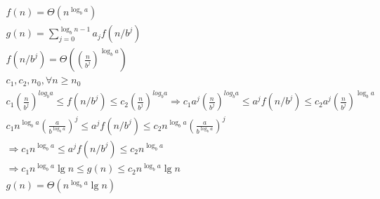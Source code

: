 $$
\begin{array}{l}
f(n)=\Theta\left(n^{\log _{b} a}\right) \\
g(n)=\sum_{j=0}^{\log _{b} n-1} a_{j} f\left(n / b^{j}\right) \\
f\left(n / b^{j}\right)=\Theta\left(\left(\frac{n}{b^{j}}\right)^{\log _{b} a}\right) \\
c_{1}, c_{2}, n_{0}, \forall n \geq n_{0} \\
c_{1}\left(\frac{n}{b^{j}}\right)^{l o g_{b} a} \leq f\left(n / b^{j}\right) \leq c_{2}\left(\frac{n}{b^{j}}\right)^{l o g_{b} a} \Rightarrow c_{1} a^{j}\left(\frac{n}{b^{j}}\right)^{l o g_{b} a} \leq a^{j} f\left(n / b^{j}\right) \leq c_{2} a^{j}\left(\frac{n}{b^{j}}\right)^{\log _{b} a} \\
c_{1} n^{\log _{b} a}\left(\frac{a}{b^{\log _{b} a}}\right)^{j} \leq a^{j} f\left(n / b^{j}\right) \leq c_{2} n^{\log _{b} a}\left(\frac{a}{b^{\log _{b} a}}\right)^{j} \\
\Rightarrow c_{1} n^{\log _{b} a} \leq a^{j} f\left(n / b^{j}\right) \leq c_{2} n^{\log _{b} a} \\
\Rightarrow c_{1} n^{\log _{b} a} \lg n \leq g(n) \leq c_{2} n^{\log _{b} a} \lg n \\
g(n)=\Theta\left(n^{\log _{b} a} \lg n\right)
\end{array}
$$
 

